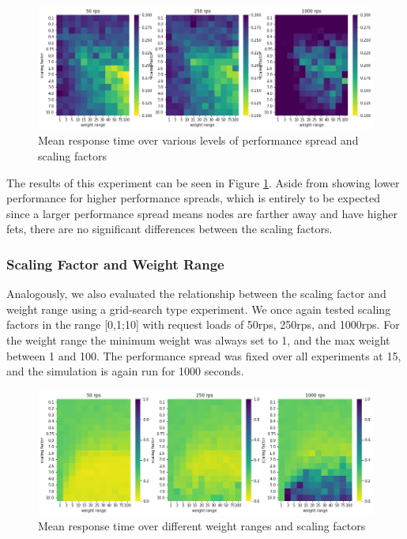 \documentclass[draft,final]{vutinfth} %
\begin{document}
\begin{figure}
    \centering
    \includegraphics[width=14cm]{graphics/graphs/lb_hyper_scaling_vs_performance_spread.png}
    \caption{Mean response time over various levels of performance spread and scaling factors}
    \label{fig:lb_hyper_scaling_perfspread}
\end{figure}

The results of this experiment can be seen in Figure \ref{fig:lb_hyper_scaling_perfspread}.
Aside from showing lower performance for higher performance spreads, which is entirely to be expected since a larger performance spread means nodes are farther away and have higher \glspl{fet}, there are no significant differences between the scaling factors.

\subsubsection{Scaling Factor and Weight Range}
Analogously, we also evaluated the relationship between the scaling factor and weight range using a grid-search type experiment.
We once again tested scaling factors in the range [0,1;10] with request loads of 50\gls{rps}, 250\gls{rps}, and 1000\gls{rps}.
For the weight range the minimum weight was always set to 1, and the max weight between 1 and 100.
The performance spread was fixed over all experiments at 15, and the simulation is again run for 1000 seconds.

\begin{figure}
    \centering
    \includegraphics[width=14cm]{graphics/graphs/lb_hyper_scaling_vs_weight_range.png}
    \caption{Mean response time over different weight ranges and scaling factors}
    \label{fig:lb_hyper_weightrange_scaling}
\end{figure}
\end{document}
